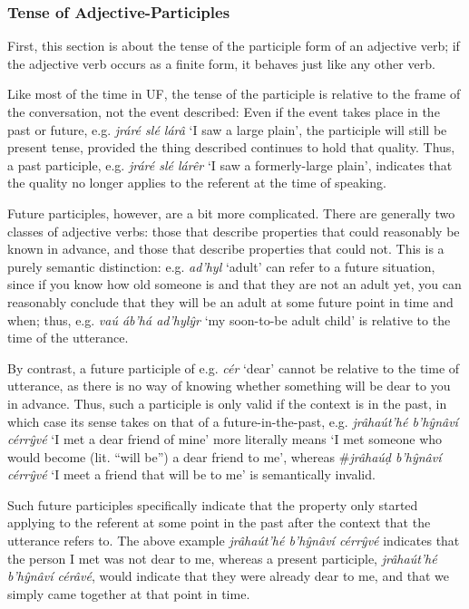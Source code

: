 \documentclass[a4paper, 12pt, twoside, final]{article}
\let \w \textit
\begin{document}
\subsubsection{Tense of Adjective-Participles}
First, this section is about the tense of the participle form of an adjective verb; if the adjective verb occurs as a
finite form, it behaves just like any other verb.

Like most of the time in UF, the tense of the participle is relative to the frame of the conversation, not
the event described: Even if the event takes place in the past or future, e.g. \w{jráré slé lárâ} ‘I saw a large plain’,
the participle will still be present tense, provided the thing described continues to hold that quality. Thus, a past
participle, e.g. \w{jráré slé lárêr} ‘I saw a formerly-large plain’, indicates that the quality no longer applies to
the referent at the time of speaking.

Future participles, however, are a bit more complicated. There are generally two classes of adjective verbs: those that
describe properties that
could reasonably be known in advance, and those that describe properties that could not. This is a purely semantic distinction: e.g. \w{ad’hyl}
‘adult’ can refer to a future situation, since if you know how old someone is and that they are not an adult yet, you
can reasonably conclude that they will be an adult at some future point in time and when; thus, e.g. \w{vaú áb’há ad’hylŷr}
‘my soon-to-be adult child’ is relative to the time of the utterance.

By contrast, a future participle of e.g. \w{cér} ‘dear’ cannot be relative to the time of utterance, as there is no way of
knowing whether something will be dear to you in advance. Thus, such a participle is only valid if the context is in
the past, in which case its sense takes on that of a future-in-the-past, e.g. \w{jrâhaút’hé b’hŷnâví cérrŷvé} ‘I met a dear
friend of mine’ more literally means ‘I met someone who would become (lit. “will be”) a dear friend to me’, whereas
\#\w{jrâhaúḍ b’hŷnâví cérrŷvé} ‘I meet a friend that will be to me’ is semantically invalid.

Such future participles specifically indicate that the property only started applying to the referent at some point in the
past after the context that the utterance refers to. The above example \w{jrâhaút’hé b’hŷnâví cérrŷvé} indicates that the
person I met was not dear to me, whereas a present participle, \w{jrâhaút’hé b’hŷnâví cérâvé}, would indicate that
they were already dear to me, and that we simply came together at that point in time.
\end{document}
